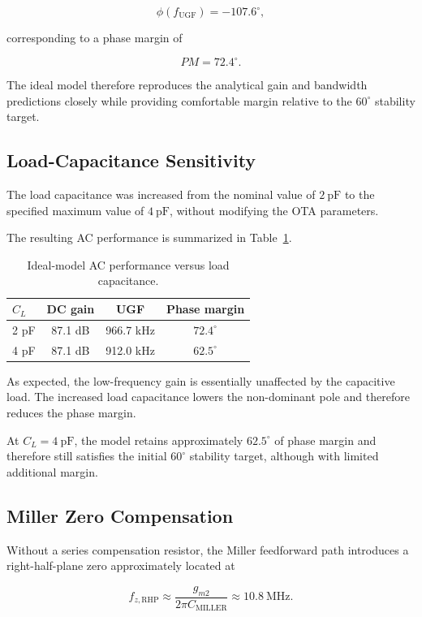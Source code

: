 \[
\phi(f_{\mathrm{UGF}}) = -107.6^\circ,
\]

corresponding to a phase margin of

\[
\boxed{PM = 72.4^\circ}.
\]

The ideal model therefore reproduces the analytical gain and bandwidth
predictions closely while providing comfortable margin relative to the
$60^\circ$ stability target.

\subsection{Load-Capacitance Sensitivity}

The load capacitance was increased from the nominal value of
$2~\mathrm{pF}$ to the specified maximum value of $4~\mathrm{pF}$,
without modifying the OTA parameters.

The resulting AC performance is summarized in
Table~\ref{tab:ideal_load_sweep}.

\begin{table}[ht]
    \centering
    \caption{Ideal-model AC performance versus load capacitance.}
    \label{tab:ideal_load_sweep}
    \begin{tabular}{lccc}
        \hline
        $C_L$ & DC gain & UGF & Phase margin \\
        \hline
        2 pF & 87.1 dB & 966.7 kHz & $72.4^\circ$ \\
        4 pF & 87.1 dB & 912.0 kHz & $62.5^\circ$ \\
        \hline
    \end{tabular}
\end{table}

As expected, the low-frequency gain is essentially unaffected by the
capacitive load. The increased load capacitance lowers the non-dominant
pole and therefore reduces the phase margin.

At $C_L=4~\mathrm{pF}$, the model retains approximately $62.5^\circ$ of
phase margin and therefore still satisfies the initial $60^\circ$
stability target, although with limited additional margin.

\subsection{Miller Zero Compensation}

Without a series compensation resistor, the Miller feedforward path
introduces a right-half-plane zero approximately located at

\[
f_{z,\mathrm{RHP}}
\approx
\frac{g_{m2}}
     {2\pi C_{\mathrm{MILLER}}}
\approx
10.8~\mathrm{MHz}.
\]


